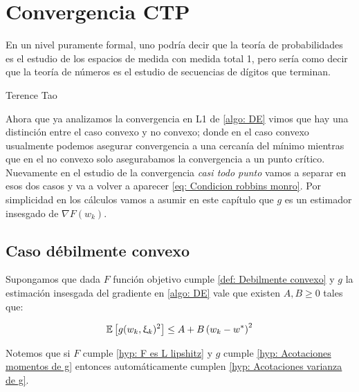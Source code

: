 \chapter{Convergencia CTP }\label{ch:convergenciaCTP}

\epigraph{En un nivel puramente formal, uno podr\'ia decir que la teor\'ia de probabilidades es el estudio de los espacios de medida con medida total 1, pero ser\'ia como decir que la teor\'ia de n\'umeros es el estudio de secuencias de d\'igitos que terminan.}{Terence Tao}

Ahora que ya analizamos la convergencia en L1 de \ref{algo: DE} vimos que hay una distinci\'on entre el caso convexo y no convexo; donde en el caso convexo usualmente podemos asegurar convergencia a una cercan\'ia del m\'inimo mientras que en el no convexo solo asegurabamos la convergencia a un punto cr\'itico. Nuevamente en el estudio de la convergencia \textit{casi todo punto} vamos a separar en esos dos casos y va a volver a aparecer \ref{eq: Condicion robbins monro}. Por simplicidad en los c\'alculos vamos a asumir en este cap\'itulo que $g$ es un estimador insesgado de $\nabla F(w_k)$.

\section{Caso d\'ebilmente convexo}

\begin{hyp}
	\label{hyp: Acotaciones varianza de g}
	Supongamos que dada $F$ funci\'on objetivo cumple \ref{def: Debilmente convexo} y $g$ la estimaci\'on insesgada del gradiente en \ref{algo: DE} vale que existen $A,B \geq 0$ tales que:
	
	\begin{equation*}
		\label{eq: Segundo momento acotado de g insesgado}
		\mathbb{E} \left[g(w_k, \upxi_{k})^2\right] \leq A + B \left(w_k - w^*\right)^2
	\end{equation*}
	
\end{hyp}

\begin{remark}
	Notemos que si $F$ cumple \ref{hyp: F es L lipshitz} y $g$ cumple \ref{hyp: Acotaciones momentos de g} entonces autom\'aticamente cumplen \ref{hyp: Acotaciones varianza de g}.
\end{remark}

